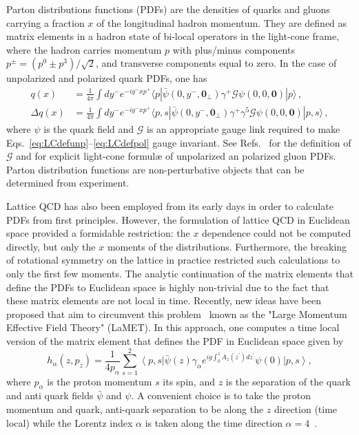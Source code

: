 Parton distributions functions (PDFs)  are the densities 
of quarks and gluons carrying a fraction $x$ of the longitudinal hadron momentum.
They  are defined as matrix 
elements in a hadron state of bi-local operators in the light-cone frame, where 
the hadron carries momentum $p$ with plus/minus components
$p^\pm=(p^0\pm p^3)/\sqrt{2}$, and transverse components equal to zero.
%
In the case of unpolarized and polarized quark PDFs, one has
\begin{align}
q(x) & = \frac{1}{4\pi}
\int dy^-e^{-iy^-xp^+}\langle p|\bar{\psi}(0,y^-,\mathbf{0}_\perp)
\gamma^+\mathcal{G}\psi(0,0,\mathbf{0})|p\rangle\,,
\label{eq:LCdefunp}\\
\Delta q(x) & = \frac{1}{4\pi}
\int dy^-e^{-iy^-xp^+}\langle p, s|\bar{\psi}(0,y^-,\mathbf{0}_\perp)
\gamma^+\gamma^5\mathcal{G}\psi(0,0,\mathbf{0})|p, s\rangle\,,
\label{eq:LCdefpol}
\end{align}
where $\psi$ is the quark field and $\mathcal{G}$ is an appropriate gauge link
required to make Eqs.~\eqref{eq:LCdefunp}--\eqref{eq:LCdefpol} gauge invariant.
%
See Refs.~\cite{Collins:1981uw,Curci:1980uw,Baulieu:1979mr,Collins:1989gx} 
for the definition of $\mathcal{G}$ and for
explicit light-cone formul{\ae} of unpolarized an polarized gluon PDFs.
Parton distribution functions are non-perturbative objects that can be determined  from experiment. 

Lattice QCD has also been employed from its early days in order  to calculate PDFs from first principles.  However, the
formulation of lattice QCD in Euclidean space provided a formidable
restriction: the $x$ dependence could not be computed directly, but
only the $x$ moments of the distributions.  Furthermore, the breaking
of rotational symmetry on the lattice in practice restricted such
calculations to only the first few moments. 
The analytic continuation of the matrix elements that define the PDFs to Euclidean space is highly non-trivial due to the fact that these matrix elements are not local in time.
Recently, new ideas have
been proposed that aim to circumvent this
problem~\cite{Ji:2013dva,Ji:2014gla} known as the "Large Momentum Effective Field Theory" (LaMET).
In this approach, one computes a time local version of the matrix element that defines the PDF in Euclidean space given by
%
\begin{equation}\label{eq:qPDF}
h_\alpha(z,p_z) 
= 
\frac{1}{4 p_{\alpha}}\sum_{s=1}^2\left\langle p,s\right\vert \bar{\psi}(z)\gamma_\alpha e^{ig\int_0^z
A_z(z^\prime) dz^\prime} \psi(0) \left\vert p,s\right\rangle,
\end{equation}
%
where $p_\alpha$ is the proton momentum $s$ its spin, and $z$ is the separation of the quark and anti quark fields $\bar\psi$ and $\psi$. A convenient choice is to take the 
proton momentum  and quark, anti-quark separation to be along the $z$ direction (time local) while the Lorentz index $\alpha$ is taken along the time direction $\alpha = 4$~\cite{Xiong:2013bka,Radyushkin:2016hsy,Radyushkin:2017cyf,Orginos:2017kos}. 

